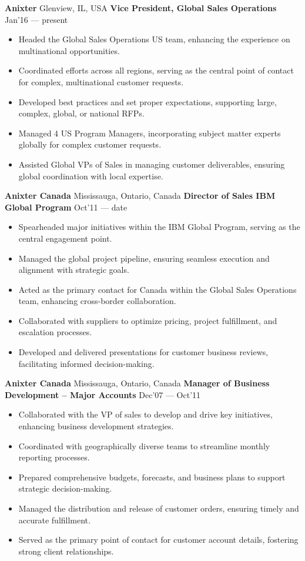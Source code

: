 \documentclass[11pt]{article}
\begin{document}
\vspace{6pt}
\textbf{Anixter} \hfill Glenview, IL, USA
\textbf{Vice President, Global Sales Operations} \hfill Jan’16 — present
\begin{itemize}[noitemsep, topsep=0pt, partopsep=0pt, leftmargin=12pt]
    \item Headed the Global Sales Operations US team, enhancing the experience on multinational opportunities.
    \item Coordinated efforts across all regions, serving as the central point of contact for complex, multinational customer requests.
    \item Developed best practices and set proper expectations, supporting large, complex, global, or national RFPs.
    \item Managed 4 US Program Managers, incorporating subject matter experts globally for complex customer requests.
    \item Assisted Global VPs of Sales in managing customer deliverables, ensuring global coordination with local expertise.
\end{itemize}
\vspace{6pt}
\textbf{Anixter Canada} \hfill Mississauga, Ontario, Canada
\textbf{Director of Sales IBM Global Program} \hfill Oct’11 — date
\begin{itemize}[noitemsep, topsep=0pt, partopsep=0pt, leftmargin=12pt]
    \item Spearheaded major initiatives within the IBM Global Program, serving as the central engagement point.
    \item Managed the global project pipeline, ensuring seamless execution and alignment with strategic goals.
    \item Acted as the primary contact for Canada within the Global Sales Operations team, enhancing cross-border collaboration.
    \item Collaborated with suppliers to optimize pricing, project fulfillment, and escalation processes.
    \item Developed and delivered presentations for customer business reviews, facilitating informed decision-making.
\end{itemize}
\vspace{6pt}
\textbf{Anixter Canada} \hfill Mississauga, Ontario, Canada
\textbf{Manager of Business Development – Major Accounts} \hfill Dec’07 — Oct’11
\begin{itemize}[noitemsep, topsep=0pt, partopsep=0pt, leftmargin=12pt]
    \item Collaborated with the VP of sales to develop and drive key initiatives, enhancing business development strategies.
    \item Coordinated with geographically diverse teams to streamline monthly reporting processes.
    \item Prepared comprehensive budgets, forecasts, and business plans to support strategic decision-making.
    \item Managed the distribution and release of customer orders, ensuring timely and accurate fulfillment.
    \item Served as the primary point of contact for customer account details, fostering strong client relationships.
\end{itemize}
\end{document}
